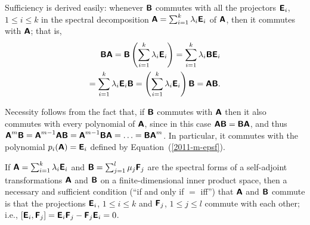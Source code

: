 {\color{OliveGreen}\bproof
Sufficiency is derived easily: whenever   $\textsf{\textbf{B}}$
commutes with all the projectors $\textsf{\textbf{E}}_i$, $1\le i\le k$
in the spectral decomposition
$\textsf{\textbf{A}}
=
\sum_{i=1}^k \lambda_i \textsf{\textbf{E}}_i
$
of   $\textsf{\textbf{A}}$,
then it commutes with $\textsf{\textbf{A}}$; that is,
\begin{equation}
\begin{split}
 \textsf{\textbf{B}}\textsf{\textbf{A}}
=
\textsf{\textbf{B}}\left(\sum_{i=1}^k \lambda_i \textsf{\textbf{E}}_i\right)
=
\sum_{i=1}^k \lambda_i \textsf{\textbf{B}}\textsf{\textbf{E}}_i
\\
=
\sum_{i=1}^k \lambda_i \textsf{\textbf{E}}_i  \textsf{\textbf{B}}
=
\left(\sum_{i=1}^k \lambda_i \textsf{\textbf{E}}_i \right)  \textsf{\textbf{B}}
=\textsf{\textbf{A}} \textsf{\textbf{B}}
.
\end{split}
\end{equation}

Necessity follows from the fact that, if  $\textsf{\textbf{B}}$
commutes with  $\textsf{\textbf{A}}$
then it also commutes with every polynomial of  $\textsf{\textbf{A}}$,
since in this case $\textsf{\textbf{A}}\textsf{\textbf{B}} = \textsf{\textbf{B}} \textsf{\textbf{A}}$, and thus
$
\textsf{\textbf{A}}^m \textsf{\textbf{B}}
=
\textsf{\textbf{A}}^{m-1} \textsf{\textbf{A}} \textsf{\textbf{B}}
=
\textsf{\textbf{A}}^{m-1}  \textsf{\textbf{B}} \textsf{\textbf{A}} =
\ldots = \textsf{\textbf{B}} \textsf{\textbf{A}}^m$.
In particular, it commutes with the polynomial $p_i(\textsf{\textbf{A}})=\textsf{\textbf{E}}_i$
defined by Equation~(\ref{2011-m-epsf}).
\eproof
}

If $\textsf{\textbf{A}}=\sum_{i=1}^k \lambda_i\textsf{\textbf{E}}_i$
and
$\textsf{\textbf{B}}=\sum_{j=1}^l \mu_j\textsf{\textbf{F}}_j$
are the spectral forms of a self-adjoint transformations
$\textsf{\textbf{A}}$ and $\textsf{\textbf{B}}$
on a finite-dimensional inner product space,
then a necessary and sufficient condition (``if and only if $=$ iff'')
that  $\textsf{\textbf{A}}$ and
 $\textsf{\textbf{B}}$ commute
is that the projections
$\textsf{\textbf{E}}_i$, $1\le i\le k$
and
$\textsf{\textbf{F}}_j$, $1\le j\le l$
commute with each other; i.e.,
$\left[\textsf{\textbf{E}}_i,\textsf{\textbf{F}}_j\right] =
\textsf{\textbf{E}}_i \textsf{\textbf{F}}_j-
\textsf{\textbf{F}}_j\textsf{\textbf{E}}_i =0 $.

